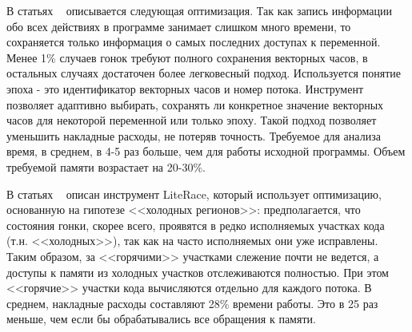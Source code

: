 В статьях ~\cite{Flanagan:2009:PLDI, Flanagan:2009} описывается следующая оптимизация.
Так как запись информации обо всех действиях в программе занимает слишком много времени, то сохраняется только информация о самых последних доступах к переменной.
Менее 1\% случаев гонок требуют полного сохранения векторных часов, в остальных случаях достаточен более легковесный подход.
Используется понятие эпоха - это идентификатор векторных часов и номер потока.
Инструмент позволяет адаптивно выбирать, сохранять ли конкретное значение векторных часов для некоторой переменной или только эпоху.
Такой подход позволяет уменьшить накладные расходы, не потеряв точность.  
Требуемое для анализа время, в среднем, в 4-5 раз больше, чем для работы исходной программы.
Объем требуемой памяти возрастает на 20-30\%.

В статьях ~\cite{Marino:2009:PLDI, Marino:2009} описан инструмент LiteRace, который использует оптимизацию, основанную на гипотезе <<холодных регионов>>: предполагается, что состояния гонки, скорее всего, проявятся в редко исполняемых участках кода (т.н. <<холодных>>), так как на часто исполняемых они уже исправлены.
Таким образом, за <<горячими>> участками слежение почти не ведется, а доступы к памяти из холодных участков отслеживаются полностью.
При этом <<горячие>> участки кода вычисляются отдельно для каждого потока.
В среднем, накладные расходы составляют 28\% времени работы.
Это в 25 раз меньше, чем если бы обрабатывались все обращения к памяти.

